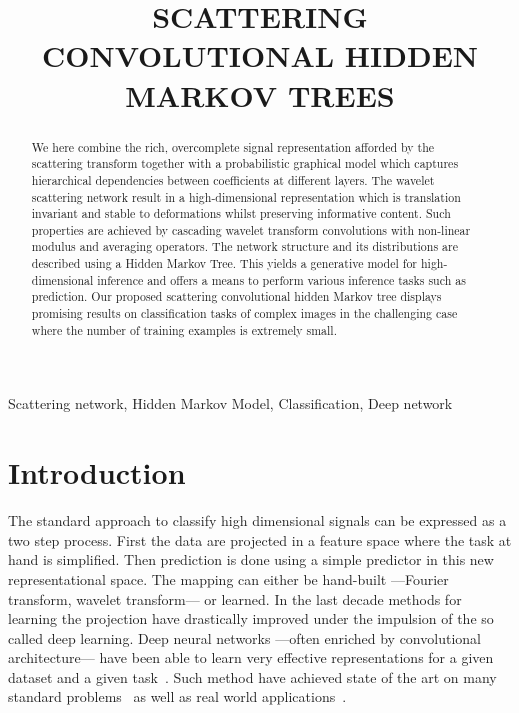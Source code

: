 \documentclass{article}
\title{SCATTERING CONVOLUTIONAL HIDDEN MARKOV TREES}
\begin{document}
%
\maketitle
%
\begin{abstract}
  We here combine the rich, overcomplete signal representation afforded by the scattering transform together with a probabilistic graphical model which captures hierarchical dependencies between coefficients at different layers. The wavelet scattering network result in a high-dimensional representation which is translation invariant and stable to deformations whilst preserving informative content. Such properties are achieved by cascading wavelet transform convolutions with non-linear modulus and averaging operators. The network structure and its distributions are described using a Hidden Markov Tree. This yields a generative model for high-dimensional inference and offers a means to perform various inference tasks such as prediction. Our proposed scattering convolutional hidden Markov tree displays promising results on classification tasks of complex images in the challenging case where the number of training examples is extremely small. 
\end{abstract}
%
\begin{keywords}
  Scattering network, Hidden Markov Model, Classification, Deep network
\end{keywords}
%
\section{Introduction}
  \label{sec:Intro}
  \vspace{-5pt}
  The standard approach to classify high dimensional signals can be expressed as a two step process. First the data are projected in a feature space where the task at hand is simplified. Then prediction is done using a simple predictor in this new representational space. The mapping can either be hand-built ---\eg Fourier transform, wavelet transform--- or learned. In the last decade methods for learning the projection have drastically improved under the impulsion of the so called deep learning. Deep neural networks ---often enriched by convolutional architecture--- have been able to learn very effective representations for a given dataset and a given task~\cite{salakhutdinov2009deep, vincent2010stacked,
  lecun1995convolutional}. Such method have achieved state of the art on many standard problems~\cite{krizhevsky2012imagenet, hinton2012improving} as well as real world applications~\cite{huval2015empirical}. 
\end{document}
